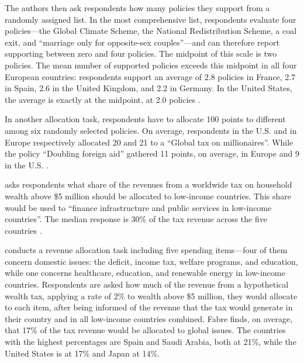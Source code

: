 \documentclass[11pt,a4paper]{article}
\begin{document}
The authors then ask respondents how many policies they support from a randomly assigned list. In the most comprehensive list, respondents evaluate four policies---the Global Climate Scheme, the National Redistribution Scheme, a coal exit, and ``marriage only for opposite-sex couples''---and can therefore report supporting between zero and four policies. The midpoint of this scale is two policies. The mean number of supported policies exceeds this midpoint in all four European countries: respondents support an average of 2.8 policies in France, 2.7 in Spain, 2.6 in the United Kingdom, and 2.2 in Germany. In the United States, the average is exactly at the midpoint, at 2.0 policies \citep[Figure S7]{fabre_majority_2025_si}.

In another allocation task, respondents have to allocate 100 points to different among six randomly selected policies. On average, respondents in the U.S. and in Europe respectively allocated 20 and 21 to a ``Global tax on millionaires''. While the policy ``Doubling foreign aid'' gathered 11 points, on average, in Europe and 9 in the U.S. \citep[Figure S30]{fabre_majority_2025_si}. 

\citet{fabre_majority_2025} asks respondents what share of the revenues from a worldwide tax on household wealth above \$5 million should be allocated to low-income countries. This share would be used to ``finance infrastructure and public services in low-income countries''. The median response is 30\% of the tax revenue across the five countries \citep[Figure S16 and ED4]{fabre_majority_2025_si}.

\citet{fabre_public_2026} conducts a revenue allocation task including five spending items---four of them concern domestic issues: the deficit, income tax, welfare programs, and education, while one concerns healthcare, education, and renewable energy in low-income countries. Respondents are asked how much of the revenue from a hypothetical wealth tax, applying a rate of 2\% to wealth above \$5 million, they would allocate to each item, after being informed of the revenue that the tax would generate in their country and in all low-income countries combined. Fabre finds, on average, that 17\% of the tax revenue would be allocated to global issues. The countries with the highest percentages are Spain and Saudi Arabia, both at 21\%, while the United States is at 17\% and Japan at 14\%.
\end{document}

